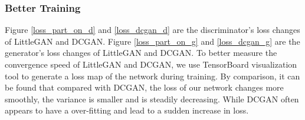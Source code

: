 \subsubsection*{Better Training}
Figure \ref{loss_part_on_d} and \ref{loss_dcgan_d} are the discriminator's loss changes of LittleGAN and DCGAN.
Figure \ref{loss_part_on_g} and \ref{loss_dcgan_g} are the generator's loss changes of LittleGAN and DCGAN.
To better measure the convergence speed of LittleGAN and DCGAN,
    we use TensorBoard visualization tool to generate a loss map of the network during training.
By comparison, it can be found that compared with DCGAN,
    the loss of our network changes more smoothly, the variance is smaller and is steadily decreasing.
While DCGAN often appears to have a over-fitting and lead to a sudden increase in loss.

